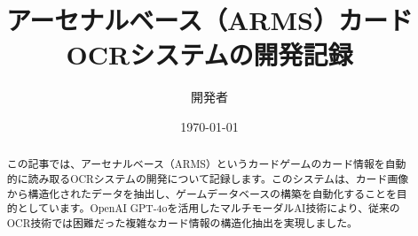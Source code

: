 \documentclass[a4paper,11pt]{jsarticle}
\title{アーセナルベース（ARMS）カードOCRシステムの開発記録}
\author{開発者}
\date{\today}
\begin{document}
\maketitle

\begin{abstract}
この記事では、アーセナルベース（ARMS）というカードゲームのカード情報を自動的に読み取るOCRシステムの開発について記録します。このシステムは、カード画像から構造化されたデータを抽出し、ゲームデータベースの構築を自動化することを目的としています。OpenAI GPT-4oを活用したマルチモーダルAI技術により、従来のOCR技術では困難だった複雑なカード情報の構造化抽出を実現しました。
\end{abstract}


\end{document}
